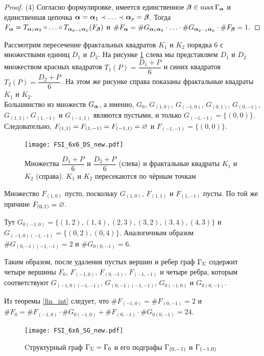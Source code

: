 \begin{proof}
(4) Согласно формулировке, имеется единственное ${\bm{\beta}}\in\max\Gamma_{\bm{\alpha}}$ и единственная цепочка ${\bm{\alpha}}={\bm{\alpha}}_1\prec\ldots\prec{\bm{\alpha}}_p={\bm{\beta}}$.
Тогда $F_{\bm{\alpha}}=T_{{\bm{\alpha}}_1{\bm{\alpha}}_2} \circ \ldots \circ  T_{{\bm{\alpha}}_{p-1}{\bm{\alpha}}_p} (F_{\bm{\beta}})$ и $\#F_{\bm{\alpha}}=\#G_{{\bm{\alpha}}_1{\bm{\alpha}}_2} \cdot \ldots \cdot  \#G_{{\bm{\alpha}}_{p-1}{\bm{\alpha}}_p}\cdot\#F_{\bm{\beta}}=1.$
\end{proof}


\begin{example} \label{ex:3_1}

Рассмотрим пересечение фрактальных квадратов $K_1$ и $K_2$ порядка $6$ с множествами единиц $D_1$ и $D_2$.
На рисунке \ref{fig:FSI_6x6_DSK} слева мы представляем $D_1$ и $D_2$ множеством красных квадратов $T_1(P)=\dfrac{D_1+P}{6}$ и синих квадратов $T_2(P)=\dfrac{D_2+P}{6}$.
На этом же рисунке справа показаны фрактальные квадраты $K_1$ и $K_2$. \\

Большинство из множеств $G_{\bm{\alpha}}$, а именно, 
$G_0$, $G_{(1,0)}$, $G_{(-1,0)}$, $G_{(0,1)}$, $G_{(0,-1)}$, $G_{(1,1)}$, $G_{(1,-1)}$ и $G_{(-1,1)}$ являются пустыми, и только $G_{(-1,-1)}=\{(0,0)\}$. 
Следовательно, $F_{(1,1)}=F_{(1,-1)}=F_{(-1,1)}=\varnothing$ и $F_{(-1,-1)}=\{(0,0)\}$.

\begin{figure}[H]
    \centering
    \texttt{[image: FSI\_6x6\_DS\_new.pdf]}
    \caption{Множества $\dfrac{D_1+P}{6}$ и $\dfrac{D_2+P}{6}$ (слева) и фрактальные квадраты $K_1$ и $K_2$ (справа). $K_1$ и $K_2$ пересекаются по чёрным точкам}
    \label{fig:FSI_6x6_DSK}
\end{figure}

Множество $F_{(1,0)}$ пусто, поскольку $G_{(1,0)}$, $F_{(1,1)}$ и $F_{(1,-1)}$ пусты. 
По той же причине $F_{(0,1)}=\varnothing$.

Тут $G_{0(-1,0)}=\{(1,2), (1,4),(2,3), (3,2), (3,4), (4,3)\}$ и $G_{(-1,0)(-1,-1)}=\{(0,2), (0,4)\}$.
Аналогичным образом $\#G_{(0,-1)(-1,-1)}=2$ и $\#G_{0(0,-1)}=6$.

Таким образом, после удаления пустых вершин и ребер
граф $\Gamma_\Sigma$ содержит четыре вершины  $F_0$, $F_{(-1,0)}$, $F_{(0,-1)}$, $F_{(-1,-1)}$ и четыре ребра, которым соответствуют $G_{(-1,0)(-1,-1)}$, $ G_{(0,-1)(-1,-1)}$, $G_{0(-1,0)}$ и $G_{0(0,-1)}$.

Из теоремы \eqref{fin_int} следует, что
$\#F_{(-1,0)}=\#F_{(0,-1)}=2$ и $\#F_0=\#F_{(-1,0)}\cdot\#G_{0(-1,0)}+\#F_{(0,-1)}\cdot\#G_{0(0,-1)}=24.$

\begin{figure}[H]
    \centering
    \texttt{[image: FSI\_6x6\_SG\_new.pdf]}
    \caption{Cтруктурный граф $\Gamma_\Sigma=\Gamma_0$ и его подграфы $\Gamma_{(0,-1)}$ и $\Gamma_{(-1,0)}$}
\end{figure} 
\end{example} 




